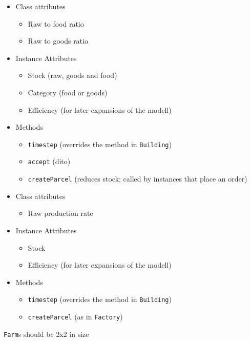 
\begin{frame}[fragile]
%
\begin{tcbraster}[raster columns=2,
                  raster equal height,
                  nobeforeafter,
                  raster column skip=0.5cm]
\begin{tcolorbox}[title=Class \texttt{Factory}]

\vspace{-3pt}
\begin{itemize}
\item Class attributes
	\begin{itemize}
	\item Raw to food ratio
	\item Raw to goods ratio
	\end{itemize}
\item Instance Attributes
	\begin{itemize}
	\item Stock (raw, goods and food)
	\item Category (food or goods)
	\item Efficiency (for later expansions of the modell)
	\end{itemize}
\item Methods
	\begin{itemize}
	\item \texttt{timestep} (overrides the method in \texttt{Building})
	\item \texttt{accept} (dito)
	\item \texttt{createParcel} (reduces stock; called by instances that place an order)
	\end{itemize}
\end{itemize}
\end{tcolorbox}
%
\begin{tcolorbox}[title=Class \texttt{Farm}]

\vspace{-3pt}
\begin{itemize}
\item Class attributes
	\begin{itemize}
	\item Raw production rate
	\end{itemize}
\item Instance Attributes
	\begin{itemize}
	\item Stock
	\item Efficiency (for later expansions of the modell)
	\end{itemize}
\item Methods
	\begin{itemize}
	\item \texttt{timestep} (overrides the method in \texttt{Building})
	\item \texttt{createParcel} (as in \texttt{Factory})
	\end{itemize}
\end{itemize}
\texttt{Farm}s should be 2x2 in size
\end{tcolorbox}
\end{tcbraster}
%
\end{frame}

